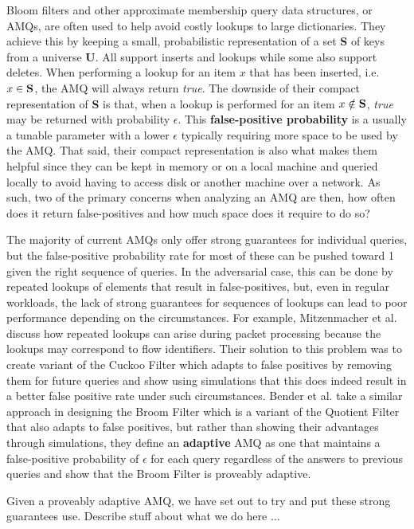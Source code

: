 \documentclass[../paper.tex]{subfiles}
\begin{document}
	Bloom filters and other approximate membership query data structures, or AMQs, are often used to help avoid costly lookups to large dictionaries.  They achieve this by keeping a small, probabilistic representation of a set {\bf S} of keys from a universe {\bf U}.  All support inserts and lookups while some also support deletes.  When performing a lookup for an item $x$ that has been inserted, i.e. $x\in {\bf S}$, the AMQ will always return {\it true}.  The downside of their compact representation of {\bf S} is that, when a lookup is performed for an item $x \notin {\bf S}$, {\it true} may be returned with probability $\epsilon$.  This {\bf false-positive probability} is a usually a tunable parameter with a lower $\epsilon$ typically requiring more space to be used by the AMQ.  That said, their compact representation is also what makes them helpful since they can be kept in memory or on a local machine and queried locally to avoid having to access disk or another machine over a network.  As such, two of the primary concerns when analyzing an AMQ are then, how often does it return false-positives and how much space does it require to do so?

	The majority of current AMQs only offer strong guarantees for individual queries, but the false-positive probability rate for most of these can be pushed toward 1 given the right sequence of queries.  In the adversarial case, this can be done by repeated lookups of elements that result in false-positives, but, even in regular workloads, the lack of strong guarantees for sequences of lookups can lead to poor performance depending on the circumstances.  For example, Mitzenmacher et al. \cite{adaptive-cuckoo} discuss how repeated lookups can arise during packet processing because the lookups may correspond to flow identifiers.  Their solution to this problem was to create variant of the Cuckoo Filter \cite{cuckoo-filter} which adapts to false positives by removing them for future queries and show using simulations that this does indeed result in a better false positive rate under such circumstances.  Bender et al. \cite{broom-filter} take a similar approach in designing the Broom Filter which is a variant of the Quotient Filter \cite{quotient-filter} that also adapts to false positives, but rather than showing their advantages through simulations, they define an {\bf adaptive} AMQ as one that maintains a false-positive probability of $\epsilon$ for each query regardless of the answers to previous queries and show that the Broom Filter is proveably adaptive.
	
	Given a proveably adaptive AMQ, we have set out to try and put these strong guarantees use.  Describe stuff about what we do here ...
\end{document}
